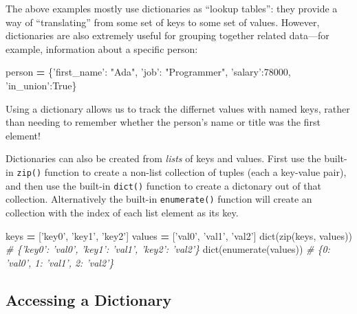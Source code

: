 \documentclass[]{book}
\newenvironment{Shaded}{\begin{snugshade}}{\end{snugshade}}
\newcommand{\DecValTok}[1]{\textcolor[rgb]{0.00,0.00,0.81}{#1}}
\newcommand{\StringTok}[1]{\textcolor[rgb]{0.31,0.60,0.02}{#1}}
\newcommand{\CommentTok}[1]{\textcolor[rgb]{0.56,0.35,0.01}{\textit{#1}}}
\newcommand{\VariableTok}[1]{\textcolor[rgb]{0.00,0.00,0.00}{#1}}
\newcommand{\OperatorTok}[1]{\textcolor[rgb]{0.81,0.36,0.00}{\textbf{#1}}}
\newcommand{\BuiltInTok}[1]{#1}
\newcommand{\NormalTok}[1]{#1}
\begin{document}
The above examples mostly use dictionaries as ``lookup tables'': they
provide a way of ``translating'' from some set of keys to some set of
values. However, dictionaries are also extremely useful for grouping
together related data---for example, information about a specific
person:

\begin{Shaded}
\begin{Highlighting}[]
\NormalTok{person }\OperatorTok{=}\NormalTok{ \{}\StringTok{'first_name'}\NormalTok{: }\StringTok{"Ada"}\NormalTok{, }\StringTok{'job'}\NormalTok{: }\StringTok{"Programmer"}\NormalTok{, }\StringTok{'salary'}\NormalTok{:}\DecValTok{78000}\NormalTok{, }\StringTok{'in_union'}\NormalTok{:}\VariableTok{True}\NormalTok{\}}
\end{Highlighting}
\end{Shaded}

Using a dictionary allows us to track the differnet values with named
keys, rather than needing to remember whether the person's name or title
was the first element!

Dictionaries can also be created from \emph{lists} of keys and values.
First use the built-in \texttt{zip()} function to create a non-list
collection of tuples (each a key-value pair), and then use the built-in
\texttt{dict()} function to create a dictonary out of that collection.
Alternatively the built-in \texttt{enumerate()} function will create an
collection with the index of each list element as its key.

\begin{Shaded}
\begin{Highlighting}[]
\NormalTok{keys }\OperatorTok{=}\NormalTok{ [}\StringTok{'key0'}\NormalTok{, }\StringTok{'key1'}\NormalTok{, }\StringTok{'key2'}\NormalTok{]}
\NormalTok{values }\OperatorTok{=}\NormalTok{ [}\StringTok{'val0'}\NormalTok{, }\StringTok{'val1'}\NormalTok{, }\StringTok{'val2'}\NormalTok{]}
\BuiltInTok{dict}\NormalTok{(}\BuiltInTok{zip}\NormalTok{(keys, values))  }\CommentTok{# \{'key0': 'val0', 'key1': 'val1', 'key2': 'val2'\}}
\BuiltInTok{dict}\NormalTok{(}\BuiltInTok{enumerate}\NormalTok{(values))  }\CommentTok{# \{0: 'val0', 1: 'val1', 2: 'val2'\}}
\end{Highlighting}
\end{Shaded}

\hypertarget{accessing-a-dictionary}{\subsection{Accessing a
Dictionary}\label{accessing-a-dictionary}}
\end{document}
